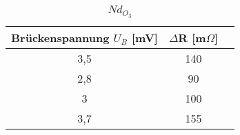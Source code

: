 \begin{table}[h]
	\begin{center}
		\begin{tabular}{ccc}
			Brückenspannung $U_B$ [mV] & $\Delta$R [m$\Omega$]\\ \hline
			3,5	&140\\
			2,8	&90\\
			3	&100\\
			3,7	&155\\
		\end{tabular}
		\caption{$Nd_O_3$}
		\label{tab2}
	\end{center}
\end{table}